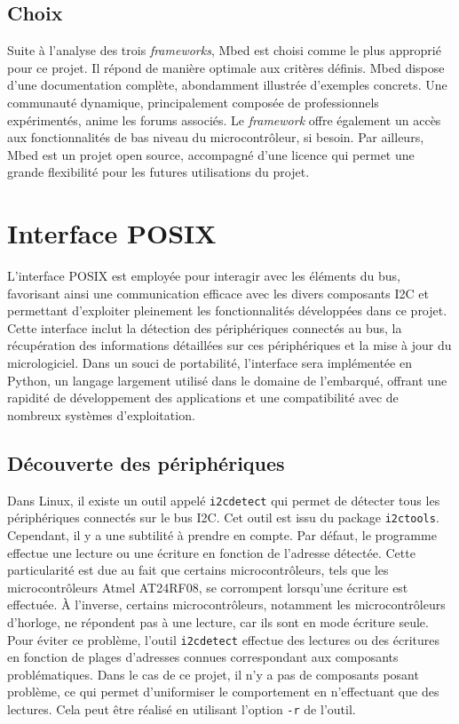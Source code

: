 \subsection{Choix}

Suite à l'analyse des trois \textit{\gls{framework}s}, Mbed est choisi comme le plus approprié pour ce projet.
Il répond de manière optimale aux critères définis.
Mbed dispose d'une documentation complète, abondamment illustrée d'exemples concrets.
Une communauté dynamique, principalement composée de professionnels expérimentés, anime les forums associés.
Le \textit{\gls{framework}} offre également un accès aux fonctionnalités de bas niveau du microcontrôleur, si besoin.
Par ailleurs, Mbed est un projet open source, accompagné d'une licence qui permet une grande flexibilité pour les futures utilisations du projet.

\section{Interface POSIX}

L'interface POSIX est employée pour interagir avec les éléments du bus, favorisant ainsi une communication efficace avec les divers composants I2C et permettant d'exploiter pleinement les fonctionnalités développées dans ce projet.
Cette interface inclut la détection des périphériques connectés au bus, la récupération des informations détaillées sur ces périphériques et la mise à jour du micrologiciel.
Dans un souci de portabilité, l'interface sera implémentée en Python, un langage largement utilisé dans le domaine de l'embarqué, offrant une rapidité de développement des applications et une compatibilité avec de nombreux systèmes d'exploitation.

\subsection{Découverte des périphériques}

Dans Linux, il existe un outil appelé \texttt{i2cdetect} qui permet de détecter tous les périphériques connectés sur le bus I2C.
Cet outil est issu du package \texttt{i2ctools}.
Cependant, il y a une subtilité à prendre en compte.
Par défaut, le programme effectue une lecture ou une écriture en fonction de l'adresse détectée.
Cette particularité est due au fait que certains microcontrôleurs, tels que les microcontrôleurs Atmel AT24RF08, se corrompent lorsqu'une écriture est effectuée.
À l'inverse, certains microcontrôleurs, notamment les microcontrôleurs d'horloge, ne répondent pas à une lecture, car ils sont en mode écriture seule.
Pour éviter ce problème, l'outil \texttt{i2cdetect} effectue des lectures ou des écritures en fonction de plages d'adresses connues correspondant aux composants problématiques.
Dans le cas de ce projet, il n'y a pas de composants posant problème, ce qui permet d'uniformiser le comportement en n'effectuant que des lectures.
Cela peut être réalisé en utilisant l'option \texttt{-r} de l'outil.

